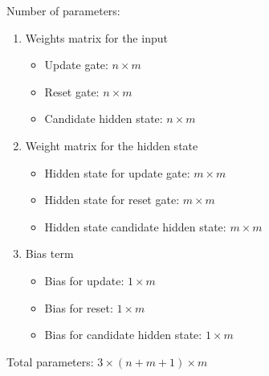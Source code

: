 \documentclass[12pt,a4paper]{article}
\begin{document}
Number of parameters:\\
\begin{enumerate}
    \item Weights matrix for the input
    \begin{itemize}
        \item Update gate: $n \times m$
        \item Reset gate: $n \times m$
        \item Candidate hidden state: $n \times m$
    \end{itemize}

    \item Weight matrix for the hidden state
    \begin{itemize}
        \item Hidden state for update gate: $m \times m$
        \item Hidden state for reset gate: $m \times m$
        \item Hidden state candidate hidden state: $m \times m$
    \end{itemize}

    \item Bias term
    \begin{itemize}
        \item Bias for update: $1 \times m$
        \item Bias for reset: $1 \times m$
        \item Bias for candidate hidden state: $1 \times m$
    \end{itemize}
\end{enumerate}
Total parameters: $3 \times ( n + m + 1 ) \times m$
\newpage


\end{document}
